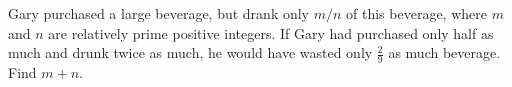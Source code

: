 Gary purchased a large beverage, but drank only $m/n$ of this beverage, where $m$ and $n$ are relatively prime positive integers. If Gary had purchased only half as much and drunk twice as much, he would have wasted only $\frac{2}{9}$ as much beverage. Find $m+n$.